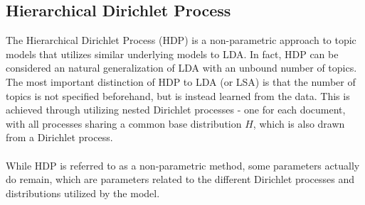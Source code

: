 \subsection{Hierarchical Dirichlet Process}

The Hierarchical Dirichlet Process (HDP) is a non-parametric approach to topic models that utilizes similar underlying models to LDA. In fact, HDP can be considered an natural generalization of LDA with an unbound number of topics. The most important distinction of HDP to LDA (or LSA) is that the number of topics is not specified beforehand, but is instead learned from the data. This is achieved through utilizing nested Dirichlet processes - one for each document, with all processes sharing a common base distribution $H$, which is also drawn from a Dirichlet process\cite{HDPPaper}. \\\\
While HDP is referred to as a non-parametric method, some parameters actually do remain, which are parameters related to the different Dirichlet processes and distributions utilized by the model. 